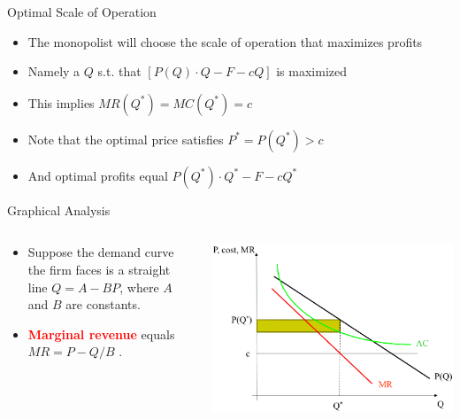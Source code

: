 \documentclass[10pt,hyperref={CJKbookmarks=true},xcolor=dvipsnames,aspectratio=169]{beamer}
\begin{document}
\begin{frame}{Optimal Scale of Operation}

\begin{itemize}
\item The monopolist will choose the scale of operation that maximizes profits 
\item Namely a $Q$ s.t. that $[P(Q)\cdot Q-F-cQ]$
is maximized 
\item This implies $MR(Q^{*})=MC(Q^{*})=c$ 
\item Note that the optimal price satisfies $P^{*}=P(Q^{*})>c$ 
\item And optimal profits equal $P(Q^{*})\cdot Q^{*}-F-cQ^{*}$
\end{itemize}
\end{frame}

\begin{frame}{Graphical Analysis}


\begin{columns}[onlytextwidth]
\begin{column}{0.5\textwidth}
\begin{itemize}
\item Suppose the demand curve the firm faces is a straight line $Q=A-BP$,
where $A$ and $B$ are constants. 
\item \textbf{\textcolor{red}{Marginal revenue}} equals $MR=P-Q/B$
. 
\end{itemize}

\end{column}
\begin{column}{0.5\textwidth}
\includegraphics[width=\columnwidth]{fig/krugman/lec6-12}
\end{column}
\end{columns}


\end{frame}
\end{document}
